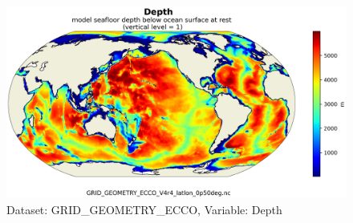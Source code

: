 \begin{figure}[H]
\centering
\includegraphics[scale=0.55]{../images/v4r4/plots/latlon_plots_coords/Geometry_Parameters_for_the_0.5_degree_Lat-Lon_Model_Grid_(Version_4_Release_4)/Depth.png}
\caption{Dataset: GRID\_GEOMETRY\_ECCO, Variable: Depth}
\label{tab:table-GRID_GEOMETRY_ECCO_Depth-Plot}
\end{figure}
\newpage
\pagebreak
